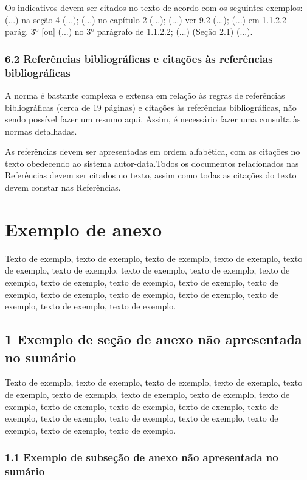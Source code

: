 \documentclass[
	12pt,				%
	oneside,			%
	a4paper,			%
	english,			%
	brazil				%
	]{abntex2ppgsi}
\begin{document}
\begin{anexosenv}
Os indicativos devem ser citados no texto de acordo com os seguintes exemplos: (...) na seção 4 (...); (...) no capítulo 2 (...); (...) ver 9.2 (...); (...) em 1.1.2.2 parág. 3º [ou] (...) no 3º parágrafo de 1.1.2.2; (...) (Seção 2.1) (...).

\subsection*{6.2 Referências bibliográficas e citações às referências bibliográficas}

A norma é bastante complexa e extensa em relação às regras de referências bibliográficas (cerca de 19 páginas) e citações às referências bibliográficas, não sendo possível fazer um resumo aqui. Assim, é necessário fazer uma consulta às normas detalhadas.

As referências devem ser apresentadas em ordem alfabética, com as citações no texto obedecendo ao sistema autor-data.Todos os documentos relacionados nas Referências devem ser citados no texto, assim como todas as citações do texto devem constar nas Referências.

\chapter{Exemplo de anexo}

Texto de exemplo, texto de exemplo, texto de exemplo, texto de exemplo, texto de exemplo, texto de exemplo, texto de exemplo, texto de exemplo, texto de exemplo, texto de exemplo, texto de exemplo, texto de exemplo, texto de exemplo, texto de exemplo, texto de exemplo, texto de exemplo, texto de exemplo, texto de exemplo, texto de exemplo.

\section*{1 Exemplo de seção de anexo não apresentada no sumário}

Texto de exemplo, texto de exemplo, texto de exemplo, texto de exemplo, texto de exemplo, texto de exemplo, texto de exemplo, texto de exemplo, texto de exemplo, texto de exemplo, texto de exemplo, texto de exemplo, texto de exemplo, texto de exemplo, texto de exemplo, texto de exemplo, texto de exemplo, texto de exemplo, texto de exemplo.

\subsection*{1.1 Exemplo de subseção de anexo não apresentada no sumário}


\end{anexosenv}
\end{document}
